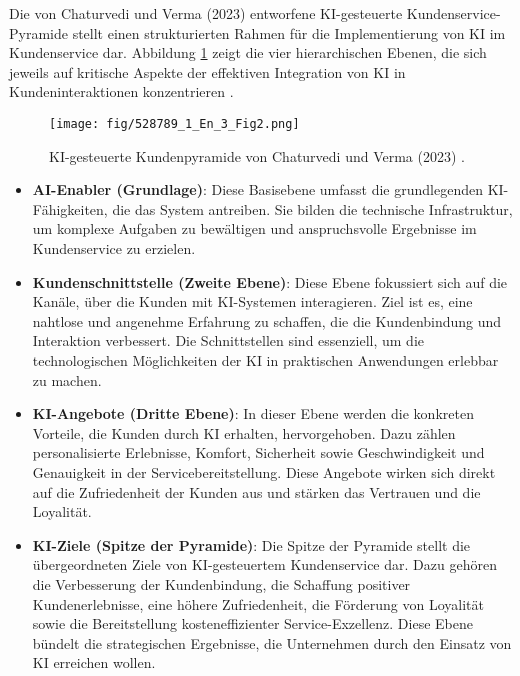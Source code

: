 \documentclass[12pt]{article}
\begin{document}
Die von Chaturvedi und Verma (2023) entworfene KI-gesteuerte Kundenservice-Pyramide stellt einen strukturierten Rahmen für die Implementierung von KI im Kundenservice dar. Abbildung \ref{fig:customer-service-pyramid} zeigt die vier hierarchischen Ebenen, die sich jeweils auf kritische Aspekte der effektiven Integration von KI in Kundeninteraktionen konzentrieren \cite{chaturvedi_opportunities_2023}.

\begin{figure}
    \centering
    \texttt{[image: fig/528789\_1\_En\_3\_Fig2.png]}
    \caption{KI-gesteuerte Kundenpyramide von Chaturvedi und Verma (2023) \cite{chaturvedi_opportunities_2023}.}
    \label{fig:customer-service-pyramid}
\end{figure}

\begin{itemize}
    \item \textbf{AI-Enabler (Grundlage)}: Diese Basisebene umfasst die grundlegenden KI-Fähigkeiten, die das System antreiben. Sie bilden die technische Infrastruktur, um komplexe Aufgaben zu bewältigen und anspruchsvolle Ergebnisse im Kundenservice zu erzielen.
    \item \textbf{Kundenschnittstelle (Zweite Ebene)}: Diese Ebene fokussiert sich auf die Kanäle, über die Kunden mit KI-Systemen interagieren. Ziel ist es, eine nahtlose und angenehme Erfahrung zu schaffen, die die Kundenbindung und Interaktion verbessert. Die Schnittstellen sind essenziell, um die technologischen Möglichkeiten der KI in praktischen Anwendungen erlebbar zu machen.
    \item \textbf{KI-Angebote (Dritte Ebene)}: In dieser Ebene werden die konkreten Vorteile, die Kunden durch KI erhalten, hervorgehoben. Dazu zählen personalisierte Erlebnisse, Komfort, Sicherheit sowie Geschwindigkeit und Genauigkeit in der Servicebereitstellung. Diese Angebote wirken sich direkt auf die Zufriedenheit der Kunden aus und stärken das Vertrauen und die Loyalität.
    \item \textbf{KI-Ziele (Spitze der Pyramide)}: Die Spitze der Pyramide stellt die übergeordneten Ziele von KI-gesteuertem Kundenservice dar. Dazu gehören die Verbesserung der Kundenbindung, die Schaffung positiver Kundenerlebnisse, eine höhere Zufriedenheit, die Förderung von Loyalität sowie die Bereitstellung kosteneffizienter Service-Exzellenz. Diese Ebene bündelt die strategischen Ergebnisse, die Unternehmen durch den Einsatz von KI erreichen wollen.
\end{itemize}
\end{document}

